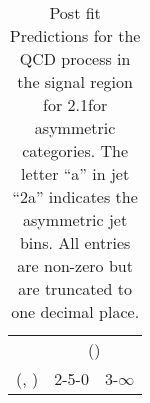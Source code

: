\begin{table}[h!]
\tiny
\centering
\caption{Post fit Predictions for the QCD process in the signal region for 2.1\ifb for asymmetric categories. The letter ``a'' in jet \eg ``2a''  indicates the asymmetric jet bins. All entries are non-zero but are truncated to one decimal place.\label{tab:predseppost_sig_qcd_asym}}
\begin{tabular}
{ccc}
	\hline\hline
	& \multicolumn{2}{c}{\scalht (\gev)} \\ 
	 (\njet,  \nb) & 2-5-0 & 3-$\infty$ \\ [0.8ex] 
\hline
	\hline
	\hline
\end{tabular}
\end{table}
